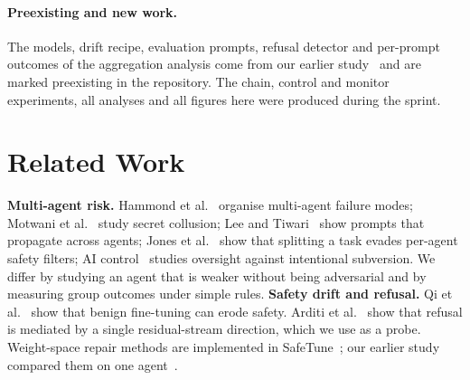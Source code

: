 \documentclass[11pt,letterpaper]{article}
\begin{document}
\paragraph{Preexisting and new work.} The models, drift recipe, evaluation prompts, refusal detector and per-prompt outcomes of the aggregation analysis come from our earlier study~\cite{mappuji2026} and are marked preexisting in the repository. The chain, control and monitor experiments, all analyses and all figures here were produced during the sprint.

\section{Related Work}
\textbf{Multi-agent risk.} Hammond et al.~\cite{hammond2025} organise multi-agent failure modes; Motwani et al.~\cite{motwani2024} study secret collusion; Lee and Tiwari~\cite{leetiwari2024} show prompts that propagate across agents; Jones et al.~\cite{jones2025} show that splitting a task evades per-agent safety filters; AI control~\cite{greenblatt2024} studies oversight against intentional subversion. We differ by studying an agent that is weaker without being adversarial and by measuring group outcomes under simple rules.
\textbf{Safety drift and refusal.} Qi et al.~\cite{qi2023} show that benign fine-tuning can erode safety. Arditi et al.~\cite{arditi2024} show that refusal is mediated by a single residual-stream direction, which we use as a probe. Weight-space repair methods are implemented in SafeTune~\cite{safetune}; our earlier study compared them on one agent~\cite{mappuji2026}.
\end{document}
